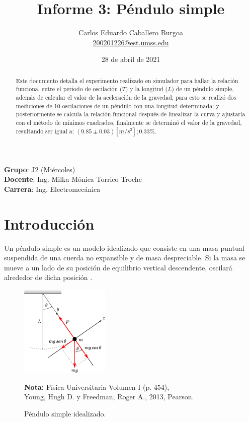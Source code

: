 \documentclass[letter,11pt]{article}
\title{Informe 3: Péndulo simple}
\author{Carlos Eduardo Caballero Burgoa \\
    \small{\href{mailto:200201226@est.umss.edu}{200201226@est.umss.edu}}
}
\date{28 de abril de 2021}
\newcommand{\source}[1]{\vspace{-11pt} \caption*{\small{\textbf{Nota:} {#1}}}}
\begin{document}
\maketitle
\begin{center}
    \textbf{Grupo}: J2 (Miércoles)\\
    \textbf{Docente}: Ing. Milka Mónica Torrico Troche\\
    \textbf{Carrera}: Ing. Electromecánica
\end{center}

\begin{abstract}
Este documento detalla el experimento realizado en simulador para hallar la
relación funcional entre el periodo de oscilación ($T$) y la longitud ($L$) de
un péndulo simple, además de calcular el valor de la aceleración de la gravedad;
para esto se realizó dos mediciones de 10 oscilaciones de un péndulo con una
longitud determinada; y posteriormente se calcula la relación funcional después
de linealizar la curva y ajustarla con el método de mínimos cuadrados,
finalmente se determinó el valor de la gravedad, resultando ser igual a:
$(9.85 \pm 0.03)[m/s^2]; 0.33\%$.
\end{abstract}

\section{Introducción}

Un péndulo simple es un modelo idealizado que consiste en una masa puntual
suspendida de una cuerda no expansible y de masa despreciable. Si la masa se
mueve a un lado de su posición de equilibrio vertical descendente, oscilará
alrededor de dicha posición \cite{Young&Freedman}.

\begin{figure}
\centering
\includegraphics[width=0.38\textwidth]{resources/f1.eps}
\caption{Péndulo simple idealizado.}
\label{figura1}
\source{Física Universitaria Volumen I (p. 454), \\
Young, Hugh D. y Freedman, Roger A., 2013, Pearson.}
\end{figure}
\end{document}
